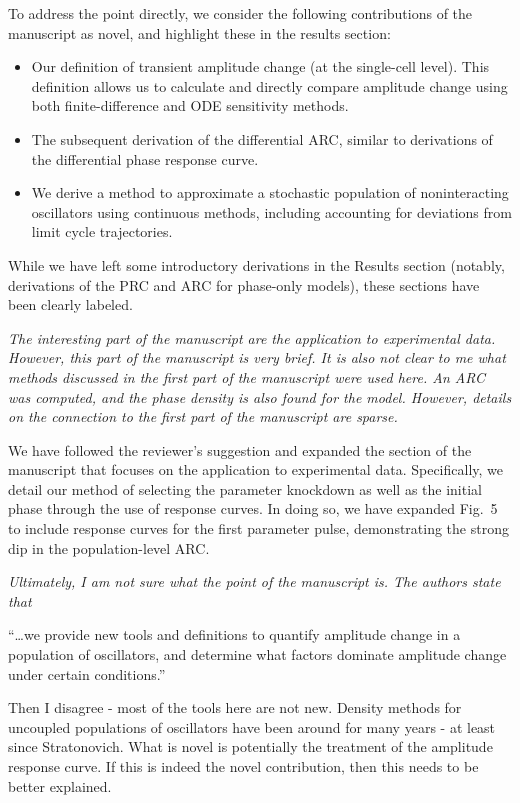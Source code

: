 \documentclass[11pt, letterpaper]{article}
\newenvironment{reviewer}{\itshape\color{gray}}{}
\begin{document}
To address the point directly, we consider the following contributions of the manuscript as novel, and highlight these in the results section:

\begin{itemize}
  \item Our definition of transient amplitude change (at the single-cell level). This definition allows us to calculate and directly compare amplitude change using both finite-difference and ODE sensitivity methods.
  \item The subsequent derivation of the differential ARC, similar to derivations of the differential phase response curve.
  \item We derive a method to approximate a stochastic population of noninteracting oscillators using continuous methods, including accounting for deviations from limit cycle trajectories.
\end{itemize}

While we have left some introductory derivations in the Results section (notably, derivations of the PRC and ARC for phase-only models), these sections have been clearly labeled.


\begin{reviewer}
The interesting part of the manuscript are the application to experimental data.
However, this part of the manuscript is very brief.
It is also not clear to me what methods discussed in the first part of the manuscript were used here.
An ARC was computed, and the phase density is also found for the model.
However, details on the connection to the first part of the manuscript are sparse.
\end{reviewer}

We have followed the reviewer's suggestion and expanded the section of the manuscript that focuses on the application to experimental data.
Specifically, we detail our method of selecting the parameter knockdown as well as the initial phase through the use of response curves.
In doing so, we have expanded Fig.~5 to include response curves for the first parameter pulse, demonstrating the strong dip in the population-level ARC.

\begin{reviewer}
Ultimately, I am not sure what the point of the manuscript is. The authors state that 
 
``\dots we provide new tools and definitions to quantify amplitude change in a population of oscillators, and determine what factors dominate amplitude change under certain conditions.''
 
Then I disagree - most of the tools here are not new.
Density methods for uncoupled populations of oscillators have been around for many years - at least since Stratonovich.
What is novel is potentially the treatment of the amplitude response curve.
If this is indeed the novel contribution, then this needs to be better explained.
\end{reviewer}
\end{document}
